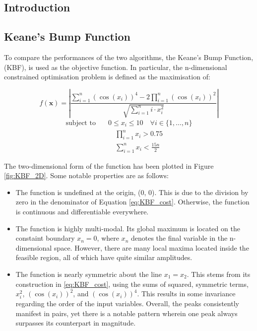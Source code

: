 \documentclass[10pt]{article}
\begin{document}
\newpage
\begin{multicols}{2}
\section{Introduction}
\subsection{Keane's Bump Function}

To compare the performances of the two algorithms, the Keane's Bump Function, (KBF), is used as the objective function. In particular, the n-dimensional constrained optimisation problem is defined as the maximisation of:

\begin{equation}
    f(\mathbf{x}) = \left| \frac{\sum_{i=1}^{n} (\cos(x_i))^4 - 2\prod_{i=1}^{n} (\cos(x_i))^2}{\sqrt{\sum_{i=1}^{n} i \cdot x_i^2}} \right|
    \label{eq:KBF_cost}
\end{equation}
\begin{equation}
    \begin{aligned}
        \text{subject to} \quad & 0 \leq x_i \leq 10 \quad \forall i \in \{1, \dots, n\} \\
        & \quad \prod_{i=1}^{n} x_i > 0.75 \\
        & \quad \sum_{i=1}^{n} x_i < \frac{15n}{2}
    \end{aligned} 
    \label{eq:KBF_constraints}
\end{equation}

The two-dimensional form of the function has been plotted in Figure \ref{fig:KBF_2D}. Some notable properties are as follows:

\begin{itemize}
    \item The function is undefined at the origin, (0, 0). This is due to the division by zero in the denominator of Equation \ref{eq:KBF_cost}. Otherwise, the function is continuous and differentiable everywhere.
    \item The function is highly multi-modal. Its global maximum is located on the constaint boundary $x_{n}=0$, where $x_n$ denotes the final variable in the n-dimensional space. However, there are many local maxima located inside the feasible region, all of which have quite similar amplitudes.
    \item The function is nearly symmetric about the line $x_1=x_2$. This stems from its construction in \ref{eq:KBF_cost}, using the sums of squared, symmetric terms, $x_i^2$, $(\cos(x_i))^2$, and $(\cos(x_i))^4$. This results in some invariance regarding the order of the input variables. Overall, the peaks consistently manifest in pairs, yet there is a notable pattern wherein one peak always surpasses its counterpart in magnitude.
\end{itemize}


\end{multicols}
\end{document}
